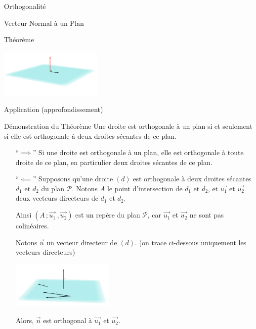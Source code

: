 \documentclass{coursbook}
\begin{document}
\begin{Gpartie}{Orthogonalité}
\begin{Spartie}{Vecteur Normal à un Plan}
\begin{SSpartie}{Théorème}
                \begin{center}
                    \includegraphics[width=5cm]{rsc/12fig5.png}
                    \parbox{\linewidth}{}
                \end{center}
            \end{SSpartie}
        \end{Spartie}
        \begin{Spartie}{Application (approfondissement)} 
            \begin{SSpartie}{Démonstration du Théorème} 
                \og Une droite est orthogonale à un plan si et seulement si elle est orthogonale à deux droites sécantes de ce plan. \fg
                \begin{itemize}[leftmargin=7ex]
                    \item[``$\implies$''] Si une droite est orthogonale à un plan, elle est orthogonale à toute droite de ce plan, en particulier deux droites sécantes de ce plan.
                    \item[``$\impliedby$''] Supposons qu'une droite $(d)$ est orthogonale à deux droites sécantes $d_1$ et $d_2$ du plan $\mathcal{P}$. Notons $A$ le point d'intersection de $d_1$ et $d_2$, et $\vec{u_1}$ et $\vec{u_2}$ deux vecteurs directeurs de $d_1$ et $d_2$.

                    Ainsi $\left(A\,;\vec{u_1}\,,\vec{u_2}\right)$ est un repère du plan $\mathcal{P}$, car $\vec{u_1}$ et $\vec{u_2}$ ne sont pas colinéaires.

                    Notons $\vec{n}$ un vecteur directeur de $(d)$. (on trace ci-dessous uniquement les vecteurs directeurs)
                    \begin{center}
                        \includegraphics[width=5cm]{rsc/12fig6.png}
                        \parbox{\linewidth}{}
                    \end{center}
                    \vspace{1ex}
                    Alors, $\vec{n}$ est orthogonal à $\vec{u_1}$ et $\vec{u_2}$.


\end{itemize}
\end{SSpartie}
\end{Spartie}
\end{Gpartie}
\end{document}
